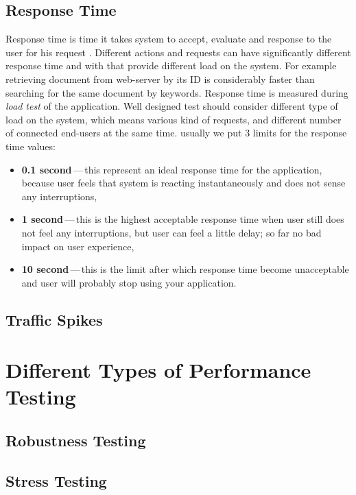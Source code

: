 \subsection{Response Time}
Response time is time it takes system to accept, evaluate and response to the user for his request . Different actions and requests can have significantly different response time and with that provide different load on the system. For example retrieving document from web-server by its ID is considerably faster than searching for the same document by keywords. Response time is measured during \emph{load test} of the application. Well designed test should consider different type of load on the system, which means various kind of requests, and different 
number of connected end-users at the same time. usually we put 3 limits for the response time values: 

\begin{itemize}
	\setlength\itemsep{0em}
	\item \textbf{0.1 second}\,---\,this represent an ideal response time for the application, because user feels that system is reacting instantaneously and does not sense any interruptions,
	\item \textbf{1 second}\,---\,this is the highest acceptable response time when user still does not feel any interruptions, but user can feel a little delay; so far no bad impact on user experience,
	\item \textbf{10 second}\,---\,this is the limit after which response time become unacceptable and user will probably stop using your application.
\end{itemize}

\subsection{Traffic Spikes}

\section{Different Types of Performance Testing}
\label{Different Types of Performance Testing}

\subsection*{Robustness Testing}

\subsection*{Stress Testing}

